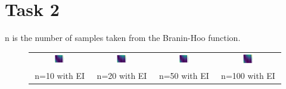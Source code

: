 \documentclass[11pt]{article}
\begin{document}
\section{Task 2}

n is the number of samples taken from the Branin-Hoo function.

\begin{figure}[H]
    \centering
    \begin{tabular}{cccc}
        \includegraphics[width=0.225\textwidth]{../Task-02/plots/true_function_rbf_n10_EI.png} &
        \includegraphics[width=0.225\textwidth]{../Task-02/plots/true_function_rbf_n20_EI.png} &
        \includegraphics[width=0.225\textwidth]{../Task-02/plots/true_function_rbf_n50_EI.png} &
        \includegraphics[width=0.225\textwidth]{../Task-02/plots/true_function_rbf_n100_EI.png} \\
        n=10 with EI & n=20 with EI & n=50 with EI & n=100 with EI \\[0.5em]
        

\end{tabular}
\end{figure}
\end{document}
